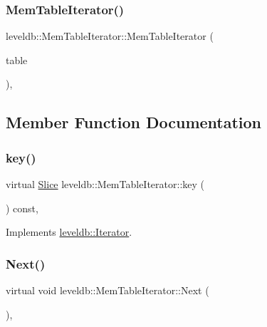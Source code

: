 \subsubsection{\texorpdfstring{MemTableIterator()}{MemTableIterator()}}
{\footnotesize\ttfamily leveldb\+::\+Mem\+Table\+Iterator\+::\+Mem\+Table\+Iterator (\begin{DoxyParamCaption}\item[{\mbox{\hyperlink{classleveldb_1_1_skip_list}{Mem\+Table\+::\+Table}} $\ast$}]{table }\end{DoxyParamCaption})\hspace{0.3cm}{\ttfamily [inline]}, {\ttfamily [explicit]}}



\subsection{Member Function Documentation}
\mbox{\label{classleveldb_1_1_mem_table_iterator_a6044613338dfb547fc5148e4b6461d15}} 
\subsubsection{\texorpdfstring{key()}{key()}}
{\footnotesize\ttfamily virtual \mbox{\hyperlink{classleveldb_1_1_slice}{Slice}} leveldb\+::\+Mem\+Table\+Iterator\+::key (\begin{DoxyParamCaption}{ }\end{DoxyParamCaption}) const\hspace{0.3cm}{\ttfamily [inline]}, {\ttfamily [virtual]}}



Implements \mbox{\hyperlink{classleveldb_1_1_iterator_ad17feced6e24a1b21db5ae6940c1f220}{leveldb\+::\+Iterator}}.

\mbox{\label{classleveldb_1_1_mem_table_iterator_a8ce5457cf61b989ce1ceec80084f891c}} 
\subsubsection{\texorpdfstring{Next()}{Next()}}
{\footnotesize\ttfamily virtual void leveldb\+::\+Mem\+Table\+Iterator\+::\+Next (\begin{DoxyParamCaption}{ }\end{DoxyParamCaption})\hspace{0.3cm}{\ttfamily [inline]}, {\ttfamily [virtual]}}



